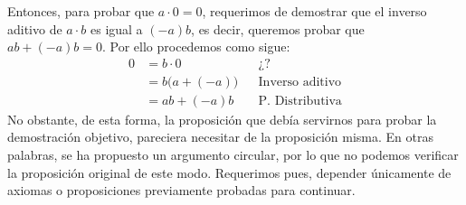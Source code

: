 \documentclass[11pt]{article}
\begin{document}
Entonces, para probar que $a\cdot 0 = 0$, requerimos de demostrar que el inverso aditivo de $a\cdot b$ es igual a $(-a)b$, es decir, queremos probar que $ab+(-a)b=0$. Por ello procedemos como sigue:
\begin{align*}
    0 &= b \cdot 0&& \text{¿?}\\
    &= b\bigl(a+(-a)\bigr)&& \text{Inverso aditivo}\\
    &= ab + (-a)b && \text{P. Distributiva}
\end{align*}
No obstante, de esta forma, la proposición que debía servirnos para probar la demostración objetivo, pareciera necesitar de la proposición misma. En otras palabras, se ha propuesto un argumento circular, por lo que no podemos verificar la proposición original de este modo. Requerimos pues, depender únicamente de axiomas o proposiciones previamente probadas para continuar.

\pagebreak
\end{document}
